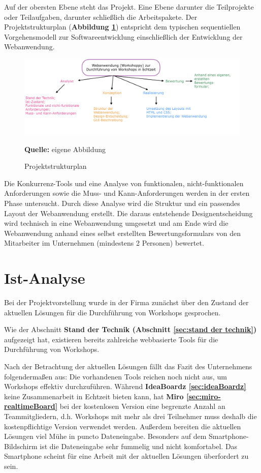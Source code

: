 Auf der obersten Ebene steht das Projekt. Eine Ebene darunter die Teilprojekte oder Teilaufgaben, darunter schließlich die Arbeitspakete. Der Projektstrukturplan (\textbf{Abbildung \ref{fig:projektstruktur}}) entspricht dem typischen sequentiellen Vorgehensmodell zur Softwareentwicklung einschließlich der Entwicklung der Webanwendung. 

\begin{figure}[H]
  \begin{center}
    \includegraphics[scale=0.4]{img/projektstruktur}
	\caption{Projektstrukturplan} 
	\footnotesize\sffamily\textbf{Quelle:} eigene Abbildung  
	\label{fig:projektstruktur}
  \end{center}   
\end{figure}

Die Konkurrenz-Tools und eine Analyse von funktionalen, nicht-funktionalen Anforderungen sowie die Muss- und Kann-Anforderungen werden in der ersten Phase untersucht. Durch diese Analyse wird die Struktur und ein passendes Layout der Webanwendung erstellt. Die daraus entstehende Designentscheidung wird technisch in eine Webanwendung umgesetzt und am Ende wird die Webanwendung anhand eines selbst erstellten Bewertungsformulars von den Mitarbeiter im Unternehmen (mindestens 2 Personen) bewertet.

\newpage
\section{Ist-Analyse}
\label{sec:istAnalyse}
Bei der Projektvorstellung wurde in der Firma zunächst über den Zustand der aktuellen Lösungen für die Durchführung von Workshops gesprochen.\bigskip

Wie der Abschnitt \textbf{Stand der Technik (Abschnitt \ref{sec:stand der technik})} aufgezeigt hat, existieren bereits zahlreiche webbasierte Tools für die Durchführung von Workshops.\bigskip

Nach der Betrachtung der aktuellen Lösungen fällt das Fazit des Unternehmens folgendermaßen aus: Die vorhandenen Tools reichen noch nicht aus, um Workshops effektiv durchzuführen. Während \textbf{IdeaBoardz \ref{sec:ideaBoardz}} keine Zusammenarbeit in Echtzeit bieten kann, hat \textbf{Miro \ref{sec:miro-realtimeBoard}} bei der kostenlosen Version eine begrenzte Anzahl an Teammitgliedern, d.h. Workshops mit mehr als drei Teilnehmer muss deshalb die kostenpflichtige Version verwendet werden. Außerdem bereiten die aktuellen Lösungen viel Mühe in puncto Dateneingabe. Besonders auf dem Smartphone-Bildschirm ist die Dateneingabe sehr fummelig und nicht komfortabel. Das Smartphone scheint für eine Arbeit mit der aktuellen Lösungen überfordert zu sein. \bigskip

